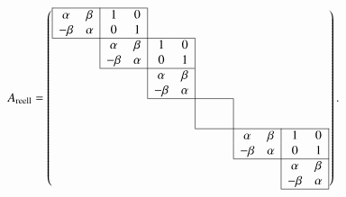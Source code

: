 \begin{equation}
\def\temp#1{\multicolumn{1}{|c}{#1\mathstrut}}
\def\semp#1{\multicolumn{1}{c|}{#1\mathstrut}}
A_{\text{reell}}
=
\left(
\begin{array}{cccccccccccc}
\cline{1-4}
\temp{\alpha}& \beta&\temp{     1}&     0&\temp{}      &      &      &      &      &      &&\\
\temp{-\beta}&\alpha&\temp{     0}&     1&\temp{}      &      &      &      &      &      &&\\
\cline{1-6}
      &      &\temp{\alpha}& \beta&\temp{     1}&     0&\temp{}      &      &      &      &&\\
      &      &\temp{-\beta}&\alpha&\temp{     0}&     1&\temp{}      &      &      &      &&\\
\cline{3-6}
      &      &      &      &\temp{\alpha}& \beta&\temp{}      &      &      &      &&\\
      &      &      &      &\temp{-\beta}&\alpha&\temp{}      &      &      &      &&\\
\cline{5-8}
      &      &      &      &      &      &\temp{\phantom{0}}&\phantom{0}&\temp{      }&      &&\\
      &      &      &      &      &      &\temp{\phantom{0}}&\phantom{0}&\temp{      }&      &&\\
\cline{7-12}
      &      &      &      &      &      &      &      &\temp{\alpha}& \beta&\temp{     1}&\semp{     0}\\
      &      &      &      &      &      &      &      &\temp{-\beta}&\alpha&\temp{     0}&\semp{     1}\\
\cline{9-12}
      &      &      &      &      &      &      &      &      &      &\temp{\alpha}&\semp{ \beta}\\
      &      &      &      &      &      &      &      &      &      &\temp{-\beta}&\semp{\alpha}\\
\cline{11-12}
\end{array}\right).
\label{buch:eigenwerte:eqn:reellenormalform}
\end{equation}

